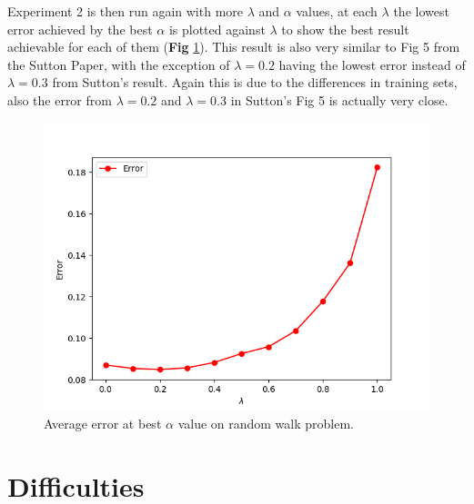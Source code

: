 \documentclass[10pt]{article}
\begin{document}
Experiment 2 is then run again with more $\lambda$ and $\alpha$ values, at each $\lambda$ the lowest error achieved by the best $\alpha$ is plotted against $\lambda$ to show the best result achievable for each of them (\textbf{Fig} \ref{fig:fig5}). This result is also very similar to Fig 5 from the Sutton Paper, with the exception of $\lambda=0.2$ having the lowest error instead of $\lambda=0.3$ from Sutton's result. Again this is due to the differences in training sets, also the error from $\lambda=0.2$ and $\lambda=0.3$ in Sutton's Fig 5 is actually very close.



\begin{figure}[H]
  \centering
  \includegraphics[width=0.6\linewidth]{../results/experiment3_2.png}
     \caption{Average error at best $\alpha$ value on random walk problem.}
  \label{fig:fig5}
\end{figure}





\section{Difficulties} \label{difficulties}
\end{document}
